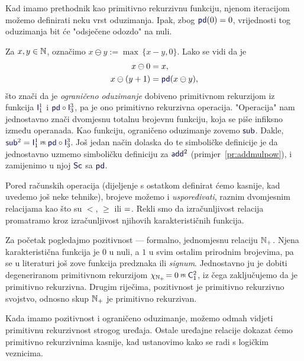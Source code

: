 Kad imamo prethodnik kao primitivno rekurzivnu funkciju, njenom iteracijom mo\-že\-mo definirati neku vrst oduzimanja. Ipak, zbog $\f{pd}(0)=0$, vrijednosti tog oduzimanja bit će "odsječene odozdo" na nuli.

\begin{primjer}[{name=[primitivna rekurzivnost ograničenog oduzimanja]}]\label{pr:sub}
Za $x,y\in{\mathbb N}$, označimo $x\ominus y:=\max\,\{x-y,0\}$. Lako se vidi da je
\begin{align}
    x\ominus0&=x\text,\\
    x\ominus(y+1)&=\f{pd}(x\ominus y)\text,
\end{align}
što znači da je \emph{ograničeno oduzimanje} dobiveno primitivnom rekurzijom iz funkcija $\f I_1^1$ i $\f{pd}\circ\f I_3^3$, pa je ono primitivno rekurzivna operacija. "Operacija" nam jednostavno znači dvomjesnu totalnu brojevnu funkciju, koja se piše infiksno između operanada. Kao funkciju, ograničeno oduzimanje zovemo $\f{sub}$. Dakle, $\f{sub}^2=\f I_1^1\pr\f{pd}\circ\f I_3^3$. Još jedan način dolaska do te simboličke definicije je da jednostavno uzmemo simboličku definiciju za $\f{add}^2$ (primjer~\ref{pr:addmulpow}), i zamijenimo u njoj $\f{Sc}$ sa $\f{pd}$.
\end{primjer}

Pored računskih operacija (dijeljenje s ostatkom definirat ćemo kasnije, kad uvedemo još neke tehnike), brojeve možemo i \emph{uspoređivati}, raznim dvomjesnim relacijama  kao što su $<$, $\ge$ ili $=$. Rekli smo da izračunljivost relacija promatramo kroz izračunljivost njihovih karakterističnih funkcija.

\begin{primjer}[{name=[primitivna rekurzivnost pozitivnosti]}]\label{pr:N+prn}
Za početak pogledajmo pozitivnost --- formalno, jednomjesnu relaciju ${\mathbb N}_+$. Njena karakteristična funkcija je $0$ u nuli, a $1$ u svim ostalim prirodnim brojevima, pa se u literaturi još zove funkcija predznaka ili \emph{signum}. Jednostavno ju je dobiti degeneriranom primitivnom rekurzijom $\chi_{\N_+}\!=0\pr\f C_1^2$, iz čega zaključujemo da je primitivno rekurzivna. Drugim riječima, pozitivnost je primitivno rekurzivno svojstvo, odnosno skup ${\mathbb N}_+$ je primitivno rekurzivan.
\end{primjer}

Kada imamo pozitivnost i ograničeno oduzimanje, možemo odmah vidjeti primitivnu rekurzivnost strogog uređaja. Ostale uređajne relacije dokazat ćemo primitivno rekurzivnima kasnije, kad ustanovimo kako se radi s logičkim veznicima.

